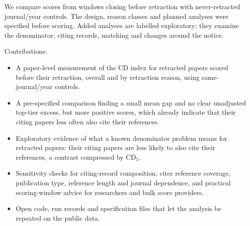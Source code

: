 We compare scores from windows closing before retraction with never-retracted journal/year controls.
The design, reason classes and planned analyses were specified before scoring. Added analyses are labelled
exploratory; they examine the denominator, citing records, matching and changes around the notice.

Contributions:
\begin{itemize}
\item A paper-level measurement of the CD index for retracted papers scored before their retraction, overall and by
retraction reason, using same-journal/year controls.
\item A pre-specified comparison finding a small mean gap and no clear unadjusted top-tier excess, but more positive scores,
which already indicate that their citing papers less often also cite their references.
\item Exploratory evidence of what a known denominator problem means for retracted papers: their citing papers
are less likely to also cite their references, a contrast compressed by CD$_5$.
\item Sensitivity checks for citing-record composition, citer reference coverage, publication type, reference length
and journal dependence, and practical scoring-window advice for researchers and bulk score providers.
\item Open code, run records and specification files that let the analysis be repeated on the public data.
\end{itemize}
